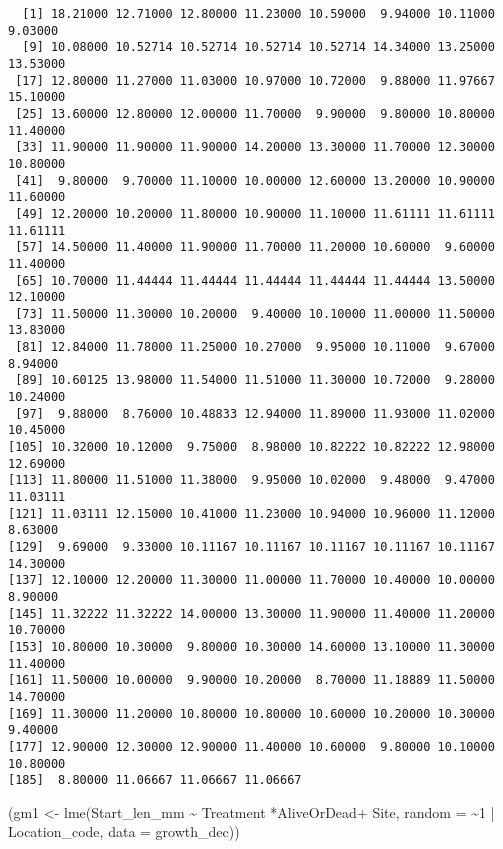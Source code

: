 \documentclass[
  letterpaper,
  DIV=11,
  numbers=noendperiod]{scrartcl}
\newenvironment{Shaded}{\begin{snugshade}}{\end{snugshade}}
\newcommand{\AttributeTok}[1]{\textcolor[rgb]{0.40,0.45,0.13}{#1}}
\newcommand{\DecValTok}[1]{\textcolor[rgb]{0.68,0.00,0.00}{#1}}
\newcommand{\FunctionTok}[1]{\textcolor[rgb]{0.28,0.35,0.67}{#1}}
\newcommand{\NormalTok}[1]{\textcolor[rgb]{0.00,0.23,0.31}{#1}}
\newcommand{\OtherTok}[1]{\textcolor[rgb]{0.00,0.23,0.31}{#1}}
\newcommand{\SpecialCharTok}[1]{\textcolor[rgb]{0.37,0.37,0.37}{#1}}
\begin{document}
\begin{Shaded}
\end{Shaded}

\begin{verbatim}
  [1] 18.21000 12.71000 12.80000 11.23000 10.59000  9.94000 10.11000  9.03000
  [9] 10.08000 10.52714 10.52714 10.52714 10.52714 14.34000 13.25000 13.53000
 [17] 12.80000 11.27000 11.03000 10.97000 10.72000  9.88000 11.97667 15.10000
 [25] 13.60000 12.80000 12.00000 11.70000  9.90000  9.80000 10.80000 11.40000
 [33] 11.90000 11.90000 11.90000 14.20000 13.30000 11.70000 12.30000 10.80000
 [41]  9.80000  9.70000 11.10000 10.00000 12.60000 13.20000 10.90000 11.60000
 [49] 12.20000 10.20000 11.80000 10.90000 11.10000 11.61111 11.61111 11.61111
 [57] 14.50000 11.40000 11.90000 11.70000 11.20000 10.60000  9.60000 11.40000
 [65] 10.70000 11.44444 11.44444 11.44444 11.44444 11.44444 13.50000 12.10000
 [73] 11.50000 11.30000 10.20000  9.40000 10.10000 11.00000 11.50000 13.83000
 [81] 12.84000 11.78000 11.25000 10.27000  9.95000 10.11000  9.67000  8.94000
 [89] 10.60125 13.98000 11.54000 11.51000 11.30000 10.72000  9.28000 10.24000
 [97]  9.88000  8.76000 10.48833 12.94000 11.89000 11.93000 11.02000 10.45000
[105] 10.32000 10.12000  9.75000  8.98000 10.82222 10.82222 12.98000 12.69000
[113] 11.80000 11.51000 11.38000  9.95000 10.02000  9.48000  9.47000 11.03111
[121] 11.03111 12.15000 10.41000 11.23000 10.94000 10.96000 11.12000  8.63000
[129]  9.69000  9.33000 10.11167 10.11167 10.11167 10.11167 10.11167 14.30000
[137] 12.10000 12.20000 11.30000 11.00000 11.70000 10.40000 10.00000  8.90000
[145] 11.32222 11.32222 14.00000 13.30000 11.90000 11.40000 11.20000 10.70000
[153] 10.80000 10.30000  9.80000 10.30000 14.60000 13.10000 11.30000 11.40000
[161] 11.50000 10.00000  9.90000 10.20000  8.70000 11.18889 11.50000 14.70000
[169] 11.30000 11.20000 10.80000 10.80000 10.60000 10.20000 10.30000  9.40000
[177] 12.90000 12.30000 12.90000 11.40000 10.60000  9.80000 10.10000 10.80000
[185]  8.80000 11.06667 11.06667 11.06667
\end{verbatim}

\begin{Shaded}
\begin{Highlighting}[]
\NormalTok{(gm1 }\OtherTok{\textless{}{-}} \FunctionTok{lme}\NormalTok{(Start\_len\_mm }\SpecialCharTok{\textasciitilde{}}\NormalTok{ Treatment }\SpecialCharTok{*}\NormalTok{AliveOrDead}\SpecialCharTok{+}\NormalTok{ Site, }
            \AttributeTok{random =} \SpecialCharTok{\textasciitilde{}}\DecValTok{1} \SpecialCharTok{|}\NormalTok{ Location\_code,}
              \AttributeTok{data =}\NormalTok{ growth\_dec))}
\end{Highlighting}
\end{Shaded}
\end{document}
